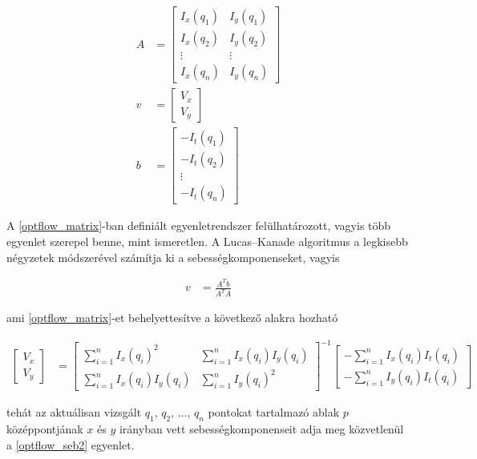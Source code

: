 \begin{align}\label{eq:optflow_matrix}
A &= \left[ \begin{array}{cc} I_x(q_1) & I_y(q_1) \\ I_x(q_2) & I_y(q_2) \\ \vdots & \vdots \\ I_x(q_n) & I_y(q_n) \end{array} \right] \nonumber \\
v &= \left[ \begin{array}{c} V_x \\ V_y \end{array} \right] \nonumber \\
b &= \left[ \begin{array}{c} -I_t(q_1) \\ -I_t(q_2) \\ \vdots \\ -I_t(q_n) \end{array} \right]
\end{align}

A \eqref{optflow_matrix}-ban definiált egyenletrendszer felülhatározott, vagyis több egyenlet szerepel benne, mint ismeretlen. A Lucas--Kanade algoritmus a legkisebb négyzetek módszerével számítja ki a sebességkomponenseket, vagyis

\begin{align}\label{eq:optflow_seb1}
v &= \frac{A^T b}{A^T A}
\end{align}

ami \eqref{optflow_matrix}-et behelyettesítve a következő alakra hozható

\begin{align}\label{eq:optflow_seb2}
\left[ \begin{array}{c} V_x \\ V_y \end{array} \right] &= \left[ \begin{array}{cc} \sum_{i=1}^n I_x(q_i)^2 & \sum_{i=1}^n I_x(q_i)I_y(q_i) \\ \sum_{i=1}^n I_x(q_i)I_y(q_i) & \sum_{i=1}^n I_y(q_i)^2 \end{array} \right]^{-1} \left[ \begin{array}{c} - \sum_{i=1}^n I_x(q_i)I_t(q_i) \\ - \sum_{i=1}^n I_y(q_i)I_t(q_i) \end{array} \right]
\end{align}

tehát az aktuálisan vizsgált $q_1$, $q_2$, $\ldots$, $q_n$ pontokat tartalmazó ablak $p$ középpontjának $x$ és $y$ irányban vett sebességkomponenseit adja meg közvetlenül a \eqref{optflow_seb2} egyenlet.

